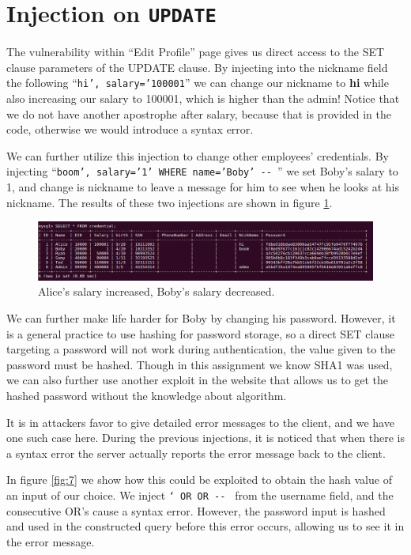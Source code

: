 \documentclass[12pt,reqno]{amsart}
\newcommand{\code}[1]{\texttt{#1}}
\begin{document}
\newpage
\section{Injection on \code{UPDATE}}
The vulnerability within ``Edit Profile'' page gives us direct access to the SET clause parameters of the UPDATE clause. By injecting into the nickname field the following ``\code{hi', salary='100001}'' we can change our nickname to \textbf{hi} while also increasing our salary to 100001, which is higher than the admin! Notice that we do not have another apostrophe after salary, because that is provided in the code, otherwise we would introduce a syntax error.

We can further utilize this injection to change other employees' credentials. By injecting ``\code{boom', salary='1' WHERE name='Boby' -{}- }'' we set Boby's salary to 1, and change is nickname to leave a message for him to see when he looks at his nickname. The results of these two injections are shown in figure \ref{fig:6}.

\begin{figure}[h]
\includegraphics[width=\linewidth]{screenshots/SQL_UPDATE_1-2.png}
\caption{Alice's salary increased, Boby's salary decreased.}
\label{fig:6}
\end{figure}

We can further make life harder for Boby by changing his password. However, it is a general practice to use hashing for password storage, so a direct SET clause targeting a password will not work during authentication, the value given to the password must be hashed. Though in this assignment we know SHA1 was used, we can also further use another exploit in the website that allows us to get the hashed password without the knowledge about algorithm.

It is in attackers favor to give detailed error messages to the client, and we have one such case here. During the previous injections, it is noticed that when there is a syntax error the server actually reports the error message back to the client. 

In figure \ref{fig:7} we show how this could be exploited to obtain the hash value of an input of our choice. We inject \code{` OR OR -{}- } from the username field, and the consecutive OR's cause a syntax error. However, the password input is hashed and used in the constructed query before this error occurs, allowing us to see it in the error message.
\end{document}
